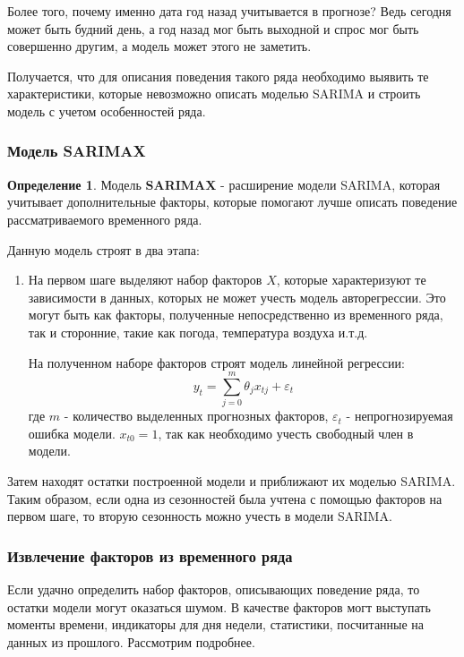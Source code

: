 \documentclass[aps,%
12pt,%
final,%
oneside,
onecolumn,%
musixtex, %
superscriptaddress,%
centertags]{article} %
\theoremstyle{plain}
\theoremstyle{definition}
\newtheorem{definition}{Определение}[subsection]
\theoremstyle{remark}
\begin{document}
Более того, почему именно дата год назад учитывается в прогнозе? Ведь сегодня может быть будний день, а год назад мог быть выходной и спрос мог быть совершенно другим, а модель может этого не заметить.

Получается, что для описания поведения такого ряда необходимо выявить те характеристики, которые невозможно описать моделью SARIMA и строить модель с учетом особенностей ряда.

\subsubsection{Модель SARIMAX}

\begin{definition}
	Модель \textbf{SARIMAX} - расширение модели SARIMA, которая учитывает дополнительные факторы, которые помогают лучше описать поведение рассматриваемого временного ряда.
\end{definition}

Данную модель строят в два этапа:

\begin{enumerate}
	\item На первом шаге выделяют набор факторов $X$, которые характеризуют те зависимости в данных, которых не может учесть модель авторегрессии. Это могут быть как факторы, полученные непосредственно из временного ряда, так и сторонние, такие как погода, температура воздуха и.т.д.

	На полученном наборе факторов строят модель линейной регрессии:
	$$y_t = \sum\limits_{j=0}^m \theta_jx_{tj} + \varepsilon_t$$
	где $m$ - количество выделенных прогнозных факторов, $\varepsilon_t$ - непрогнозируемая ошибка модели. $x_{t0} =1$, так как необходимо учесть свободный член в модели.
\end{enumerate}

Затем находят остатки построенной модели и приближают их моделью SARIMA. Таким образом, если одна из сезонностей была учтена с помощью факторов на первом шаге, то вторую сезонность можно учесть в модели SARIMA.

\subsubsection{Извлечение факторов из временного ряда}

Если удачно определить набор факторов, описывающих поведение ряда, то остатки модели могут оказаться шумом. В качестве факторов могт выступать моменты времени, индикаторы для дня недели, статистики, посчитанные на данных из прошлого. Рассмотрим подробнее.
\end{document}
